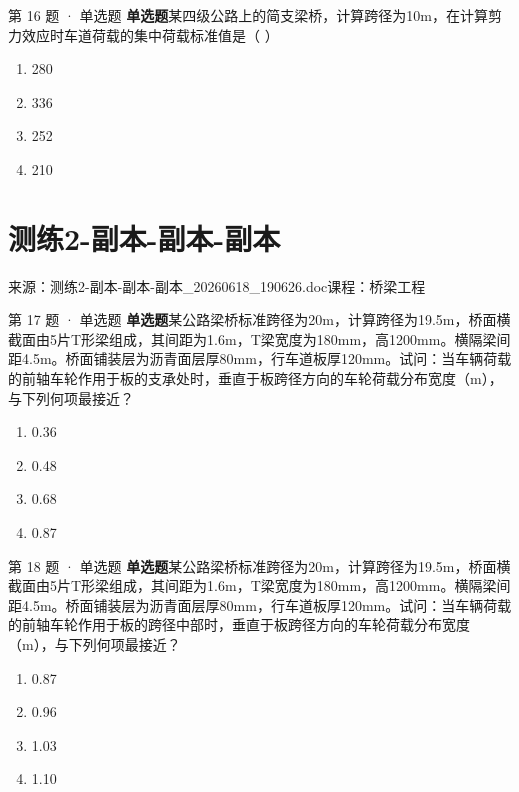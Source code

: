 \documentclass[UTF8,zihao=-4,openany]{ctexbook}
\newenvironment{choices}{\begin{enumerate}[label=\Alph*.,leftmargin=9mm,labelsep=3mm,itemsep=2pt,topsep=4pt]}{\end{enumerate}}
\newcommand{\qtype}[1]{\textcolor{brand}{\sffamily\bfseries #1}}
\newcommand{\sourcefile}[1]{\textcolor{muted}{\small\sffamily 来源：#1}}
\begin{document}
\begin{questionbox}{第 16 题 · 单选题}
\qtype{单选题}\quad 某四级公路上的简支梁桥，计算跨径为10m，在计算剪力效应时车道荷载的集中荷载标准值是（ ）
\begin{choices}
\item 280
\item 336
\item 252
\item 210
\end{choices}
\end{questionbox}

\chapter{测练2-副本-副本-副本}

\sourcefile{测练2-副本-副本-副本\_20260618\_190626.doc}\quad \textcolor{muted}{\small\sffamily 课程：桥梁工程}

\begin{questionbox}{第 17 题 · 单选题}
\qtype{单选题}\quad 某公路梁桥标准跨径为20m，计算跨径为19.5m，桥面横截面由5片T形梁组成，其间距为1.6m，T梁宽度为180mm，高1200mm。横隔梁间距4.5m。桥面铺装层为沥青面层厚80mm，行车道板厚120mm。试问：当车辆荷载的前轴车轮作用于板的支承处时，垂直于板跨径方向的车轮荷载分布宽度（m），与下列何项最接近？
\begin{choices}
\item 0.36
\item 0.48
\item 0.68
\item 0.87
\end{choices}
\end{questionbox}

\begin{questionbox}{第 18 题 · 单选题}
\qtype{单选题}\quad 某公路梁桥标准跨径为20m，计算跨径为19.5m，桥面横截面由5片T形梁组成，其间距为1.6m，T梁宽度为180mm，高1200mm。横隔梁间距4.5m。桥面铺装层为沥青面层厚80mm，行车道板厚120mm。试问：当车辆荷载的前轴车轮作用于板的跨径中部时，垂直于板跨径方向的车轮荷载分布宽度（m），与下列何项最接近？
\begin{choices}
\item 0.87
\item 0.96
\item 1.03
\item 1.10
\end{choices}
\end{questionbox}
\end{document}
